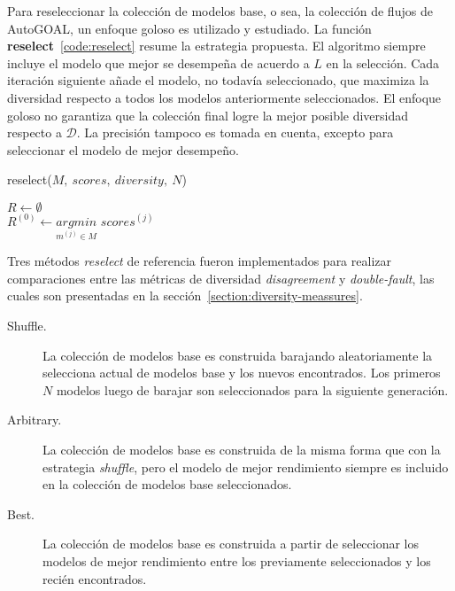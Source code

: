 Para reseleccionar la colección de modelos base, o sea, la colección de flujos de AutoGOAL, un enfoque goloso es utilizado y estudiado.
La función \textbf{reselect}~\ref{code:reselect} resume la estrategia propuesta.
El algoritmo siempre incluye el modelo que mejor se desempeña de acuerdo a $L$ en la selección. Cada iteración siguiente añade el modelo, no todavía seleccionado, que maximiza la diversidad respecto a todos los modelos anteriormente seleccionados.
El enfoque goloso no garantiza que la colección final logre la mejor posible diversidad respecto a $\mathcal{D}$.
La precisión tampoco es tomada en cuenta, excepto para seleccionar el modelo de mejor desempeño.

\begin{function}[htb!]
    \caption{reselect($M,\ scores,\ diversity,\ N$)\label{code:reselect}}

    \init $R \leftarrow \emptyset$ \\
    \init $R^{(0)} \leftarrow \underset{m^{(j)} \in M}{argmin}$ $scores^{(j)}$ \\

\end{function}

Tres métodos \textit{reselect} de referencia fueron implementados para realizar comparaciones entre las métricas de diversidad \textit{disagreement} y \textit{double-fault}, las cuales son presentadas en la sección~\ref{section:diversity-meassures}.
\begin{description}
    \item[Shuffle.]
    La colección de modelos base es construida barajando aleatoriamente la selecciona actual de modelos base y los nuevos encontrados.
    Los primeros $N$ modelos luego de barajar son seleccionados para la siguiente generación.
    \item[Arbitrary.]
    La colección de modelos base es construida de la misma forma que con la estrategia \textit{shuffle}, pero el modelo de mejor rendimiento siempre es incluido en la colección de modelos base seleccionados.
    \item[Best.]
    La colección de modelos base es construida a partir de seleccionar los modelos de mejor rendimiento entre los previamente seleccionados y los recién encontrados.
\end{description}

